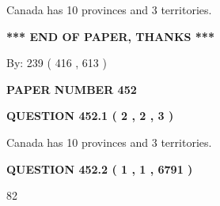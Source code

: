 \documentclass[12pt]{article}
\begin{document}
 
Canada has 10  provinces and 3 territories.
 
 
 
 
   
   
 \vspace{0.2in}
 
   
   
   
   
\vspace{1.0in} 
{\textbf{\large{ *** END OF PAPER, THANKS *** }}} 
   
   
\hspace{1.0in} By: 
 239 ( 416 ,  613 )
   
   
   
   
\newpage 
\setcounter{page}{ 
   452001 } 
   
   
   
   
 {\textbf{ \Large{ PAPER NUMBER  452  }}}
   
   
\vspace{0.2in}
   
   
   
   
   
   
 \vspace{0.2in}
 
 
 
 
   
   
  
\vspace{0.2in}
  
{\textbf{\Large{QUESTION
452.1 
 ( 2 , 2 , 3 )
}}}
  
  
 
 
\noindent{}
 
 
Canada has 10  provinces and 3 territories.
 
 
 
 
  
\vspace{0.2in}
  
{\textbf{\Large{QUESTION
452.2 
 ( 1 , 1 , 6791 )
}}}
  
  
 
 
\noindent{}

82
 
 
   
   
 \vspace{0.2in}
 
\end{document}
